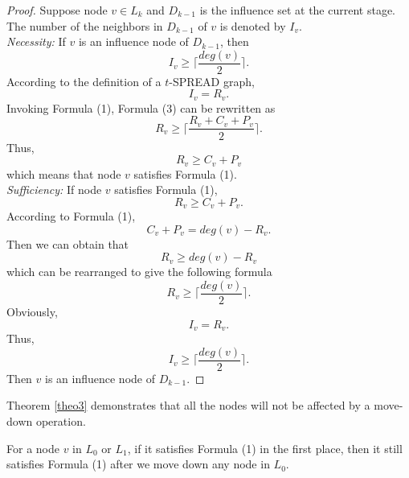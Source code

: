\begin{proof}
	Suppose node $v \in L_k$ and $D_{k-1}$ is the influence set at the current stage. The number of the neighbors in  $D_{k-1}$ of $v$ is denoted by $I_v$.\\
	\emph{Necessity: }If $v$ is an influence node of $D_{k-1}$, then
	\[ I_v \geqslant \lceil\frac{deg(v)}{2}\rceil .\]
	According to the definition of a $t$-SPREAD graph,
	\begin{equation}
	I_v=R_v.
	\end{equation}
	Invoking Formula (1), Formula (3) can be rewritten as
	\begin{equation}
	R_v\geqslant \lceil\frac{R_v+C_v+P_v}{2}\rceil .
	\end{equation}
	Thus,
	\begin{equation}
	R_v \geqslant C_v+P_v
	\end{equation}
	which means that node $v$ satisfies Formula (1).\\
	\emph{Sufficiency: }If node $v$ satisfies Formula (1), 
	\begin{equation}
	R_v\geqslant C_v+P_v .%
	\end{equation}
	According to Formula (1),
	\begin{equation}
	C_v+P_v=deg(v)-R_v.
	\end{equation}
	Then we can obtain that
	\begin{equation}
	R_v \geqslant deg(v)-R_v
	\end{equation}
	which can be rearranged to give the following formula
	\begin{equation}
	R_v \geqslant \lceil\frac{deg(v)}{2}\rceil .
	\end{equation}
	Obviously,
	\begin{equation}
	I_v=R_v.
	\end{equation}
	Thus,
	\begin{equation}
	I_v \geqslant \lceil\frac{deg(v)}{2}\rceil .
	\end{equation}
	Then $v$ is an influence node of $D_{k-1}$.
\end{proof}

Theorem \ref{theo3} demonstrates that all the nodes will not be affected by a move-down operation.
\begin{theorem} \label{theo3}
	For a node $v$ in $L_0$ or $L_1$, if it satisfies Formula (1) in the first place, then it still satisfies Formula (1) after we move down any node in $L_0$.
\end{theorem}

